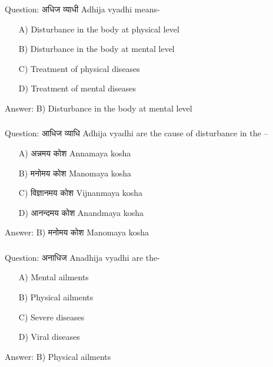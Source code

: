 \begin{frame}[fragile]\frametitle{}

Question: अधिज व्याधी Adhija vyadhi means-

\begin{itemize}
\item[A)] Disturbance in the body at physical level
\item[B)] Disturbance in the body at mental level
\item[C)] Treatment of physical diseases
\item[D)] Treatment of mental diseases
\end{itemize}

Answer: B) Disturbance in the body at mental level
\end{frame}

\begin{frame}[fragile]\frametitle{}

Question: आधिज व्याधि Adhija vyadhi are the cause of disturbance in the –

\begin{itemize}
\item[A)] अन्नमय कोश Annamaya kosha
\item[B)] मनोमय कोश Manomaya kosha
\item[C)] विज्ञानमय कोश Vijnanmaya kosha
\item[D)] आनन्दमय कोश Anandmaya kosha
\end{itemize}

Answer: B) मनोमय कोश Manomaya kosha
\end{frame}

\begin{frame}[fragile]\frametitle{}

Question: अनाधिज Anadhija vyadhi are the-

\begin{itemize}
\item[A)] Mental ailments
\item[B)] Physical ailments
\item[C)] Severe diseases
\item[D)] Viral diseases
\end{itemize}

Answer: B) Physical ailments
\end{frame}

